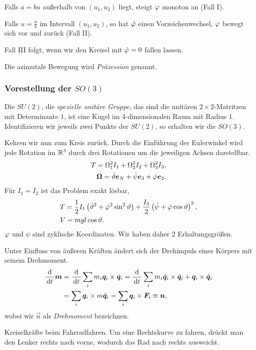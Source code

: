 Falls $a=bu$ außerhalb von $(u_1,u_2)$ liegt, steigt
$\varphi$ monoton an (Fall I).

Falls $u=\frac{a}{b}$ im Intervall $(u_1,u_2)$, so hat $\dot{\varphi}$ einen  
Vorzeichenwechsel, $\varphi$ bewegt sich vor und zurück (Fall II).

Fall III folgt, wenn wir den Kreisel mit $\dot{\varphi} = 0$ fallen lassen.

Die azimutale Bewegung wird \emph{Präzession} genannt.

\subsubsection{Vorestellung der $SO(3)$}

Die $SU(2)$, die \emph{spezielle unitäre Gruppe}, das sind die unitären
$2\times 2$-Matritzen mit Determinante $1$, ist eine Kugel im 4-dimensionalen
Raum mit Radius 1. Identifizieren wir jeweils zwei  Punkte der $SU(2)$, so
erhalten wir die $SO(3)$.

Kehren wir nun zum Kreis zurück.
Durch die Einführung der Eulerwinkel wird jede Rotation im $\mathbb{R}^3$ durch drei
Rotationen um die jeweiligen Achsen darstellbar.
\begin{align*}
T = \Omega_1^2 I_1 + \Omega_2^2 I_2 + \Omega_3^2 I_3,\\
\bm{\Omega} = \dot{\vartheta}\bm{e}_N + \dot{\psi}\bm{e}_3 + \dot{\varphi}\bm{e}_2.
\end{align*}
Für $I_1 =I_2$ ist das Problem exakt lösbar,
\begin{align*}
&T = \frac{1}{2}I_1 \left(\dot{\vartheta}^2 + \dot{\varphi}^2\sin^2\vartheta\right) +
\frac{I_3}{2}\left(\dot{\psi} + \dot{\varphi}\cos\vartheta \right)^2,\\
&V = mgl\cos\vartheta.
\end{align*}
$\varphi$ und $\psi$ sind zyklische Koordinaten. Wir haben daher 2 Erhaltungsgrößen.

Unter Einfluss von äußeren Kräften ändert sich der Drehimpuls eines Körpers mit
seinem Drehmoment.
\begin{align*}
\frac{\mathrm{d} }{\,\mathrm{d} t\,}\bm{m}
&= \frac{\mathrm{d}}{\,\mathrm{d} t\,} \sum_i m_i \bm{q}_i \times \dot{\bm{q}}_i
= \frac{\mathrm{d}}{\,\mathrm{d} t\,}
\sum_i m_i \dot{\bm{q}}_i \times \dot{\bm{q}}_i + \bm{q}_i \times \ddot{\bm{q}}_i\\
&= \sum_i \bm{q}_i \times m\ddot{\bm{q}}_i = \sum_i \bm{q}_i \times \bm{F}_i
\equiv \bm{n},
\end{align*}
wobei wir $\vec{n}$ als \emph{Drehmoment} bezeichnen.

\begin{bsp}
Kreiselkräfte beim Fahrradfahren. Um eine Rechtskurve zu fahren, drückt man den
Lenker rechts nach vorne, wodurch das Rad nach rechts ausweicht.\bsphere
\end{bsp}

